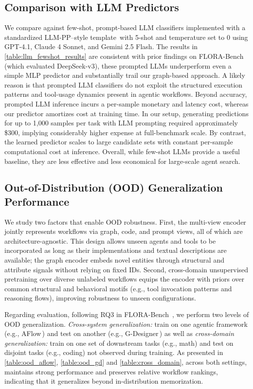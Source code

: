 \subsection{Comparison with LLM Predictors} \label{section:llm_fewshot_results}
We compare against few-shot, prompt-based LLM classifiers implemented with a standardized LLM-PP–style template\,\citep{LLM_PP} with 5-shot and temperature set to 0 using GPT-4.1, Claude 4 Sonnet, and Gemini 2.5 Flash. The results in \autoref{table:llm_fewshot_results} are consistent with prior findings on FLORA-Bench\,\citep{FLORA_Bench_25} (which evaluated DeepSeek-v3), these prompted LLMs underperform even a simple MLP predictor and substantially trail our graph-based approach. A likely reason is that prompted LLM classifiers do not exploit the structured execution patterns and tool-usage dynamics present in agentic workflows. Beyond accuracy, prompted LLM inference incurs a per-sample monetary and latency cost, whereas our predictor amortizes cost at training time. In our setup, generating predictions for up to 1,000 samples per task with LLM prompting required approximately \$300, implying considerably higher expense at full-benchmark scale. By contrast, the learned predictor scales to large candidate sets with constant per-sample computational cost at inference. Overall, while few-shot LLMs provide a useful baseline, they are less effective and less economical for large-scale agent search.

\subsection{Out-of-Distribution (OOD) Generalization Performance} \label{section:ood_results}
We study two factors that enable OOD robustness. First, the multi-view encoder jointly represents workflows via graph, code, and prompt views, all of which are architecture-agnostic. This design allows unseen agents and tools to be incorporated as long as their implementations and textual descriptions are available; the graph encoder embeds novel entities through structural and attribute signals without relying on fixed IDs. Second, cross-domain unsupervised pretraining over diverse unlabeled workflows equips the encoder with priors over common structural and behavioral motifs (e.g., tool invocation patterns and reasoning flows), improving robustness to unseen configurations.

Regarding evaluation, following RQ3 in FLORA-Bench~\citep{FLORA_Bench_25}, we perform two levels of OOD generalization. \emph{Cross-system generalization:} train on one agentic framework (e.g., AFlow\,\citep{AFlow_ICLR_25}) and test on another (e.g., G-Designer\,\citep{GDesigner_ICML_25}) as well as \emph{cross-domain generalization:} train on one set of downstream tasks (e.g., math) and test on disjoint tasks (e.g., coding) not observed during training. As presented in \autoref{table:ood_aflow}, \autoref{table:ood_gd} and \autoref{table:cross_domain}, across both settings, \ours{} maintains strong performance and preserves relative workflow rankings, indicating that it generalizes beyond in-distribution memorization. 




